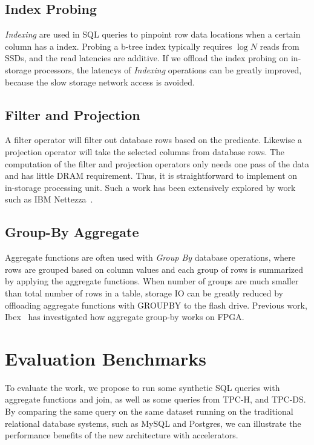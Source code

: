 \documentclass{article}
\newcommand{\indexing}{\textit{Indexing}\xspace}
\newcommand{\groupby}{\textit{Group By}\xspace}
\begin{document}
\subsection{Index Probing}
\indexing are used in SQL queries to pinpoint row data locations when a certain column has a index.
Probing a b-tree index typically requires $\log{N}$ reads from SSDs, and the read latencies are additive.
If we offload  the index probing on in-storage processors, the latencys of \indexing operations can be greatly improved, because the slow storage network access is avoided.

\subsection{Filter and Projection}

A filter operator will filter out database rows based on the predicate.
Likewise a projection operator will take the selected columns from database rows.
The computation of the filter and projection operators only needs one pass of the data and has little DRAM requirement.
Thus, it is straightforward to implement on in-storage processing unit.
Such a work has been extensively explored by work such as IBM Nettezza~\cite{netezza}.

\subsection{Group-By Aggregate}

Aggregate functions are often used with \groupby database operations, where rows are grouped based on column values and each group of rows is summarized by applying the aggregate functions.
When number of groups are much smaller than total number of rows in a table, storage IO can be greatly reduced by offloading aggregate functions with GROUPBY to the flash drive.
Previous work, Ibex~\cite{ibex} has investigated how aggregate group-by works on FPGA.




\section{Evaluation Benchmarks}
\label{sec:eval}
To evaluate the work, we propose to run some synthetic SQL queries with aggregate functions and join, as well as some queries from TPC-H, and TPC-DS.
By comparing the same query on the same dataset running on the traditional relational database systems, such as MySQL and Postgres, we can illustrate the performance benefits of the new architecture with accelerators.
\end{document}
